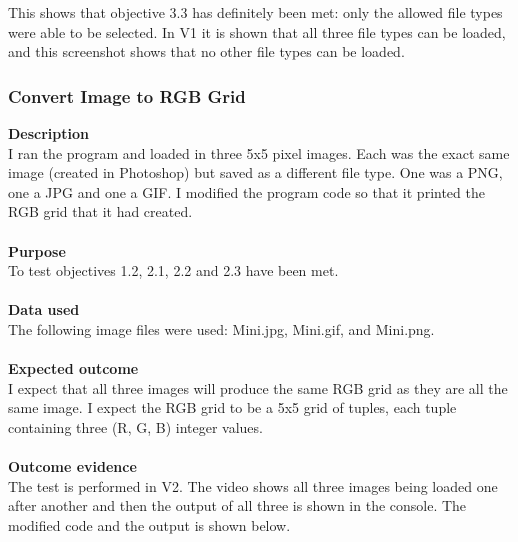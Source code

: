 \documentclass[titlepage]{article}
\begin{document}
This shows that objective 3.3 has definitely been met: only the allowed file types were able to be selected. In V1 it is shown that all three file types can be loaded, and this screenshot shows that no other file types can be loaded.\

\subsubsection{Convert Image to RGB Grid}
\textbf{Description}\\
I ran the program and loaded in three 5x5 pixel images. Each was the exact same image (created in Photoshop) but saved as a different file type. One was a PNG, one a JPG and one a GIF. I modified the program code so that it printed the RGB grid that it had created.\\\\
\textbf{Purpose}\\
To test objectives 1.2, 2.1, 2.2 and 2.3 have been met.\\\\
\textbf{Data used} \\
The following image files were used: Mini.jpg, Mini.gif, and Mini.png.\\\\
\textbf{Expected outcome}\\
I expect that all three images will produce the same RGB grid as they are all the same image. I expect the RGB grid to be a 5x5 grid of tuples, each tuple containing three (R, G, B) integer values.\\\\
\textbf{Outcome evidence}\\
The test is performed in V2. The video shows all three images being loaded one after another and then the output of all three is shown in the console. The modified code and the output is shown below.
\end{document}
